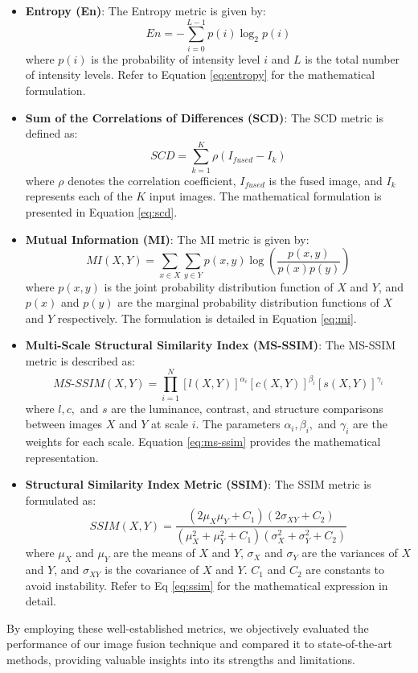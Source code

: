 \begin{itemize}
    \item \textbf{Entropy (En)}: The Entropy metric is given by:
    \begin{equation} \label{eq:entropy}
    En = -\sum_{i=0}^{L-1} p(i) \log_2 p(i)
    \end{equation}
    where \( p(i) \) is the probability of intensity level \( i \) and \( L \) is the total number of intensity levels. Refer to Equation \ref{eq:entropy} for the mathematical formulation.
    
    \item \textbf{Sum of the Correlations of Differences (SCD)}: The SCD metric is defined as:
    \begin{equation} \label{eq:scd}
    SCD = \sum_{k=1}^{K} \rho(I_{fused} - I_{k})
    \end{equation}
    where \( \rho \) denotes the correlation coefficient, \( I_{fused} \) is the fused image, and \( I_{k} \) represents each of the \( K \) input images. The mathematical formulation is presented in Equation \ref{eq:scd}.
    
    \item \textbf{Mutual Information (MI)}: The MI metric is given by:
    \begin{equation} \label{eq:mi}
    MI(X,Y) = \sum_{x \in X} \sum_{y \in Y} p(x,y) \log \left( \frac{p(x,y)}{p(x) p(y)} \right)
    \end{equation}
    where \( p(x,y) \) is the joint probability distribution function of \( X \) and \( Y \), and \( p(x) \) and \( p(y) \) are the marginal probability distribution functions of \( X \) and \( Y \) respectively. The formulation is detailed in Equation \ref{eq:mi}.
    
    \item \textbf{Multi-Scale Structural Similarity Index (MS-SSIM)}: The MS-SSIM metric is described as:
    \begin{equation} \label{eq:ms-ssim}
    MS\text{-}SSIM(X,Y) = \prod_{i=1}^{N} [l(X,Y)]^{\alpha_i} [c(X,Y)]^{\beta_i} [s(X,Y)]^{\gamma_i}
    \end{equation}
    where \( l, c, \) and \( s \) are the luminance, contrast, and structure comparisons between images \( X \) and \( Y \) at scale \( i \). The parameters \( \alpha_i, \beta_i, \) and \( \gamma_i \) are the weights for each scale. Equation \ref{eq:ms-ssim} provides the mathematical representation.
    
    \item \textbf{Structural Similarity Index Metric (SSIM)}: The SSIM metric is formulated as:
    \begin{equation} \label{eq:ssim}
    SSIM(X,Y) = \frac{(2\mu_X \mu_Y + C_1)(2\sigma_{XY} + C_2)}{(\mu_X^2 + \mu_Y^2 + C_1)(\sigma_X^2 + \sigma_Y^2 + C_2)}
    \end{equation}
    where \( \mu_X \) and \( \mu_Y \) are the means of \( X \) and \( Y \), \( \sigma_X \) and \( \sigma_Y \) are the variances of \( X \) and \( Y \), and \( \sigma_{XY} \) is the covariance of \( X \) and \( Y \). \( C_1 \) and \( C_2 \) are constants to avoid instability. Refer to Eq \ref{eq:ssim} for the mathematical expression in detail.
\end{itemize}


By employing these well-established metrics, we objectively evaluated the performance of our image fusion technique and compared it to state-of-the-art methods, providing valuable insights into its strengths and limitations.

